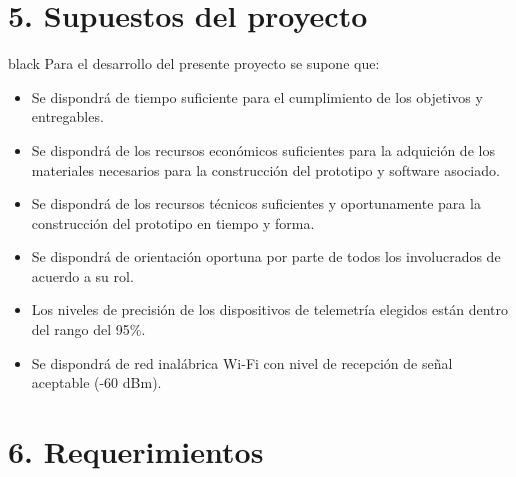 \documentclass[
11pt, %
codirector, %
]{charter}
\begin{document}
\section{5. Supuestos del proyecto}
\label{sec:supuestos}

\begin{consigna}{black}
Para el desarrollo del presente proyecto se supone que: 

\begin{itemize}
	\item Se dispondrá de tiempo suficiente para el cumplimiento de los objetivos y entregables.
	\item Se dispondrá de los recursos económicos suficientes para la adquición de los materiales necesarios para la construcción del prototipo y software asociado.
	\item Se dispondrá de los recursos técnicos suficientes y oportunamente para la construcción del prototipo en tiempo y forma.
	\item Se dispondrá de orientación oportuna por parte de todos los involucrados de acuerdo a su rol.
	\item Los niveles de precisión de los dispositivos de telemetría elegidos están dentro del rango del 95\%.
	\item Se dispondrá de red inalábrica Wi-Fi con nivel de recepción de señal aceptable (-60 dBm).
\end{itemize}

\end{consigna}

\section{6. Requerimientos}
\label{sec:requerimientos}
\end{document}
